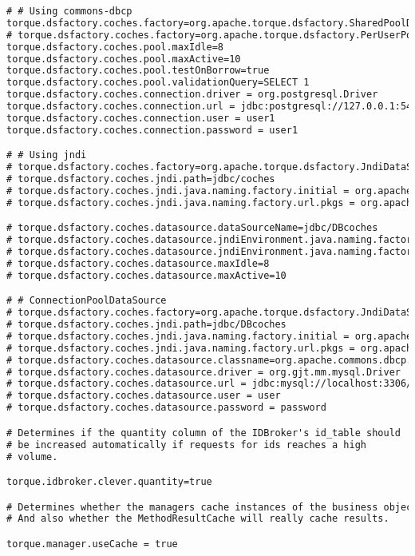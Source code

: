 \begin{lstlisting}[language=xml]
# # Using commons-dbcp
torque.dsfactory.coches.factory=org.apache.torque.dsfactory.SharedPoolDataSourceFactory
# torque.dsfactory.coches.factory=org.apache.torque.dsfactory.PerUserPoolDataSourceFactory
torque.dsfactory.coches.pool.maxIdle=8
torque.dsfactory.coches.pool.maxActive=10
torque.dsfactory.coches.pool.testOnBorrow=true
torque.dsfactory.coches.pool.validationQuery=SELECT 1
torque.dsfactory.coches.connection.driver = org.postgresql.Driver
torque.dsfactory.coches.connection.url = jdbc:postgresql://127.0.0.1:5432/coches
torque.dsfactory.coches.connection.user = user1
torque.dsfactory.coches.connection.password = user1

# # Using jndi
# torque.dsfactory.coches.factory=org.apache.torque.dsfactory.JndiDataSourceFactory
# torque.dsfactory.coches.jndi.path=jdbc/coches
# torque.dsfactory.coches.jndi.java.naming.factory.initial = org.apache.naming.java.javaURLContextFactory
# torque.dsfactory.coches.jndi.java.naming.factory.url.pkgs = org.apache.naming

# torque.dsfactory.coches.datasource.dataSourceName=jdbc/DBcoches
# torque.dsfactory.coches.datasource.jndiEnvironment.java.naming.factory.initial = org.apache.naming.java.javaURLContextFactory
# torque.dsfactory.coches.datasource.jndiEnvironment.java.naming.factory.url.pkgs = org.apache.naming
# torque.dsfactory.coches.datasource.maxIdle=8
# torque.dsfactory.coches.datasource.maxActive=10

# # ConnectionPoolDataSource
# torque.dsfactory.coches.factory=org.apache.torque.dsfactory.JndiDataSourceFactory
# torque.dsfactory.coches.jndi.path=jdbc/DBcoches
# torque.dsfactory.coches.jndi.java.naming.factory.initial = org.apache.naming.java.javaURLContextFactory
# torque.dsfactory.coches.jndi.java.naming.factory.url.pkgs = org.apache.naming
# torque.dsfactory.coches.datasource.classname=org.apache.commons.dbcp.cpdsadapter.DriverAdapterCPDS
# torque.dsfactory.coches.datasource.driver = org.gjt.mm.mysql.Driver
# torque.dsfactory.coches.datasource.url = jdbc:mysql://localhost:3306/torque
# torque.dsfactory.coches.datasource.user = user
# torque.dsfactory.coches.datasource.password = password

# Determines if the quantity column of the IDBroker's id_table should
# be increased automatically if requests for ids reaches a high
# volume.

torque.idbroker.clever.quantity=true

# Determines whether the managers cache instances of the business objects.
# And also whether the MethodResultCache will really cache results.

torque.manager.useCache = true
\end{lstlisting}